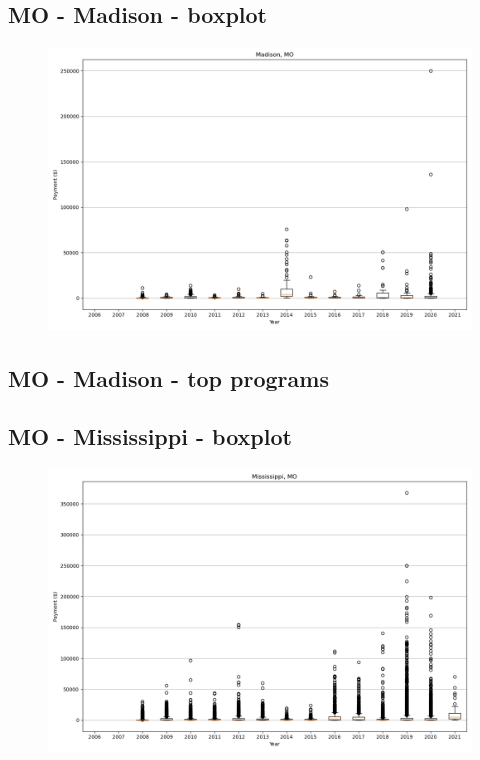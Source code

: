 \subsection*{MO - Madison - boxplot}
\begin{figure}[h]
\centering
\includegraphics[width=7in]{../output/boxplots/counties/Madison-MO_boxplot.png}
\end{figure}


\subsection*{MO - Madison - top programs}

\newpage
\subsection*{MO - Mississippi - boxplot}
\begin{figure}[h]
\centering
\includegraphics[width=7in]{../output/boxplots/counties/Mississippi-MO_boxplot.png}
\end{figure}


